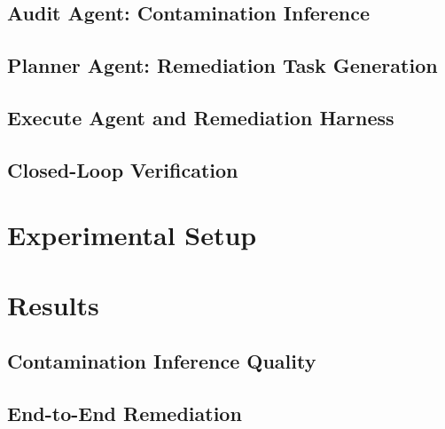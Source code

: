 \documentclass[11pt]{article}
\begin{document}
\subsection{Audit Agent: Contamination Inference}
\subsection{Planner Agent: Remediation Task Generation}
\subsection{Execute Agent and Remediation Harness}
\subsection{Closed-Loop Verification}

\section{Experimental Setup}

\section{Results}
\subsection{Contamination Inference Quality}
\subsection{End-to-End Remediation}
\end{document}
